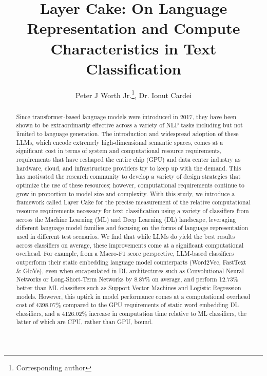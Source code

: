 \documentclass[final]{clv2025}
\begin{document}
\title{Layer Cake: On Language Representation and Compute Characteristics in Text Classification}

\author{Peter J Worth Jr.\thanks{Corresponding author}, Dr. Ionut Cardei}


\maketitle

\begin{abstract}
Since transformer-based language models were introduced in 2017, they have been shown to be extraordinarily effective across a variety of NLP tasks including but not limited to language generation. The introduction and widespread adoption of these LLMs, which encode extremely high-dimensional semantic spaces, comes at a significant cost in terms of system and computational resource requirements, requirements that have reshaped the entire chip (GPU) and data center industry as hardware, cloud, and infrastructure providers try to keep up with the demand. This has motivated the research community to develop a variety of design strategies that optimize the use of these resources; however, computational requirements continue to grow in proportion to model size and complexity. With this study, we introduce a framework called Layer Cake for the precise measurement of the relative computational resource requirements necessary for text classification using a variety of classifiers from across the Machine Learning (ML) and Deep Learning (DL) landscape, leveraging different language model families and focusing on the forms of language representation used in different test scenarios. We find that while LLMs do yield the best results across classifiers on average, these improvements come at a significant computational overhead. For example, from a Macro-F1 score perspective, LLM-based classifiers outperform their static embedding language model counterparts (Word2Vec, FastText \& GloVe), even when encapsulated in DL architectures such as Convolutional Neural Networks or Long-Short-Term Networks by 8.87\% on average, and perform 12.73\% better than ML classifiers such as Support Vector Machines and Logistic Regression models. However, this uptick in model performance comes at a computational overhead cost of 4398.07\% compared to the GPU requirements of static word embedding DL classifiers, and a 4126.02\% increase in computation time relative to ML classifiers, the latter of which are CPU, rather than GPU, bound.
\end{abstract}
\end{document}
